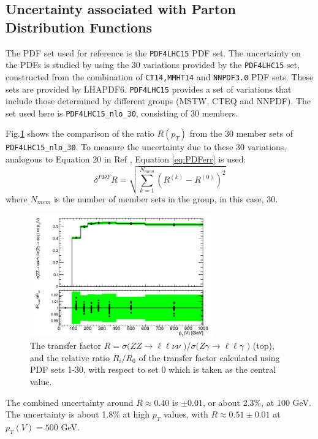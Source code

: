 \documentclass[12pt,a4paper,openright,twoside]{report}
\newcommand{\ZZ}{$ZZ\to \ell\ell\nu\nu$ }
\newcommand{\Zg}{$Z\gamma\to \ell\ell\gamma$ }
\begin{document}
\subsection{Uncertainty associated with Parton Distribution Functions}
The PDF set used for reference is the \texttt{PDF4LHC15}\cite{PDF4} PDF set. The uncertainty on the PDFs is studied by using the 30 variations provided by the \texttt{PDF4LHC15} set\cite{PDF4}, constructed from the combination of \texttt{CT14,MMHT14} and \texttt{NNPDF3.0} PDF sets. These sets are provided by LHAPDF6\cite{LHAPDF}. \texttt{PDF4LHC15} provides a set of variations that include those determined by different groups (MSTW, CTEQ and NNPDF). The set used here is \texttt{PDF4LHC15\_nlo\_30}, consisting of 30 members.

Fig.\ref{fig:PDF30var} shows the comparison of the ratio $R(p_T)$ from the 30 member sets of \texttt{PDF4LHC15\_nlo\_30}. To measure the uncertainty due to these 30 variations, analogous to Equation 20 in Ref \cite{PDF4}, Equation \ref{eq:PDFerr} is used:
\begin{equation}\label{eq:PDFerr}
	\delta^{PDF}R = \sqrt{\sum^{N_{mem}}_{k=1} (R^{(k)} - R^{(0)})^2}
\end{equation}
where $N_{mem}$ is the number of member sets in the group, in this case, 30.

\begin{figure}[H]
\centering
	\includegraphics[width = 0.7\textwidth]{R_pdf.png}
	\caption{The transfer factor $R = \sigma($\ZZ$)/\sigma($\Zg$)$ (top), and the relative ratio $R_i/R_0$ of the transfer factor  calculated using PDF sets 1-30, with respect to set 0 which is taken as the central value. }
	\label{fig:PDF30var}
\end{figure}

The combined uncertainty around $R \approx 0.40$ is $\pm 0.01$, or about 2.3\%, at 100 GeV. The uncertainty is about 1.8\% at high $p_T$ values, with $R \approx 0.51 \pm 0.01$ at $p_T(V)=500$ GeV.
\vfill
\end{document}
